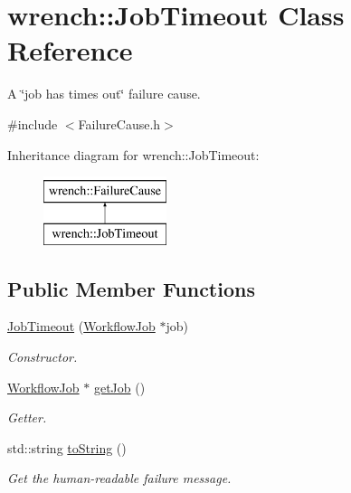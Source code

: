 \hypertarget{classwrench_1_1_job_timeout}{}\section{wrench\+:\+:Job\+Timeout Class Reference}
\label{classwrench_1_1_job_timeout}


A \char`\"{}job has times out\char`\"{} failure cause.  




{\ttfamily \#include $<$Failure\+Cause.\+h$>$}

Inheritance diagram for wrench\+:\+:Job\+Timeout\+:\begin{figure}[H]
\begin{center}
\leavevmode
\includegraphics[height=2.000000cm]{classwrench_1_1_job_timeout}
\end{center}
\end{figure}
\subsection*{Public Member Functions}
\begin{DoxyCompactItemize}
\item 
\hyperlink{classwrench_1_1_job_timeout_a352548111a16343238a1376913e80bc6}{Job\+Timeout} (\hyperlink{classwrench_1_1_workflow_job}{Workflow\+Job} $\ast$job)
\begin{DoxyCompactList}\small\item\em Constructor. \end{DoxyCompactList}\item 
\hyperlink{classwrench_1_1_workflow_job}{Workflow\+Job} $\ast$ \hyperlink{classwrench_1_1_job_timeout_a6c3fdde31850803e7eb2e159be735880}{get\+Job} ()
\begin{DoxyCompactList}\small\item\em Getter. \end{DoxyCompactList}\item 
std\+::string \hyperlink{classwrench_1_1_job_timeout_a91515ca59f71777de74a4b0b169d12e7}{to\+String} ()
\begin{DoxyCompactList}\small\item\em Get the human-\/readable failure message. \end{DoxyCompactList}\end{DoxyCompactItemize}

